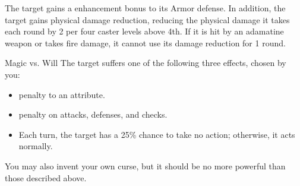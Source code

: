 \begin{spellheader}
\end{spellheader}
\begin{spellcontent}
    \begin{spelltargetinginfo}
    \end{spelltargetinginfo}
    \begin{spelleffects}
        \spelleffect The target gains a  enhancement bonus to its Armor defense. \spellbonusscalingdescription In addition, the target gains physical damage reduction, reducing the physical damage it takes each round by 2  per four caster levels above 4th. If it is hit by an adamatine weapon or takes fire damage, it cannot use its damage reduction for 1 round.
        \spelldur{\durshort}
    \end{spelleffects}
\end{spellcontent}
\begin{spellfooter}

\end{spellfooter}

\begin{spellheader}
\end{spellheader}
\begin{spellcontent}
    \begin{spelltargetinginfo}
    \end{spelltargetinginfo}
    \begin{spelleffects}
        \begin{spellattack}{Magic vs. Will}
            \spellsuccess The target suffers one of the following three effects, chosen by you:
            \begin{itemize}
                \item {} penalty to an attribute.
                \item {} penalty on attacks, defenses, and checks.
                \item Each turn, the target has a 25\% chance to take no action; otherwise, it acts normally.
            \end{itemize}
            \par You may also invent your own curse, but it should be no more powerful than those described above.
        \end{spellattack}
    \end{spelleffects}
\end{spellcontent}
\begin{spellfooter}
    \spellnotes \cursespellnotes
\end{spellfooter}

